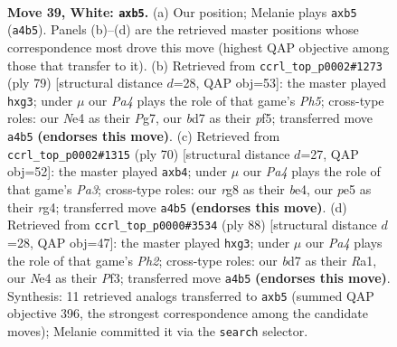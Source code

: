 \documentclass[11pt]{article}
\begin{document}
\clearpage

\begin{figure}[p]\centering
\begin{subfigure}{0.46\textwidth}\centering
\resizebox{\linewidth}{!}{%
\newchessgame
\chessboard[
  setfen={6r1/3bk3/8/pp2p3/P3N3/1P3KP1/8/6R1 w - - 0 39},
  showmover=false,
  pgfstyle=straightmove, color=movearrow, markmove={a4-b5}
]}
\caption{}
\end{subfigure}\hfill
\begin{subfigure}{0.46\textwidth}\centering
\resizebox{\linewidth}{!}{%
\newchessgame
\chessboard[
  setfen={3R4/5ppk/8/3pPP2/7p/6PP/3r4/6K1 b - - 2 40},
  showmover=false,
  pgfstyle=straightmove, color=movearrow, markmove={h4-g3}
]}
\caption{}
\end{subfigure}
\\[4pt]
\begin{subfigure}{0.46\textwidth}\centering
\resizebox{\linewidth}{!}{%
\newchessgame
\chessboard[
  setfen={3R4/1k6/4N3/p7/1p2b1r1/P7/1PP5/1K6 w - - 3 36},
  showmover=false,
  pgfstyle=straightmove, color=movearrow, markmove={a3-b4}
]}
\caption{}
\end{subfigure}\hfill
\begin{subfigure}{0.46\textwidth}\centering
\resizebox{\linewidth}{!}{%
\newchessgame
\chessboard[
  setfen={8/6p1/8/r3pp1k/P7/5Pp1/6KP/R7 w - - 0 45},
  showmover=false,
  pgfstyle=straightmove, color=movearrow, markmove={h2-g3}
]}
\caption{}
\end{subfigure}
\caption{\textbf{Move 39, White: \texttt{axb5}.} (a) Our position; Melanie plays \texttt{axb5} (\texttt{a4b5}). Panels (b)--(d) are the retrieved master positions whose correspondence most drove this move (highest QAP objective among those that transfer to it). (b) Retrieved from \texttt{ccrl\_top\_p0002\#1273} (ply 79) [structural distance $d$=28, QAP obj=53]: the master played \texttt{hxg3}; under $\mu$ our \emph{Pa4} plays the role of that game's \emph{Ph5}; cross-type roles: our \emph{N}e4 as their \emph{P}g7, our \emph{b}d7 as their \emph{p}f5; transferred move \texttt{a4b5} \textbf{(endorses this move)}. (c) Retrieved from \texttt{ccrl\_top\_p0002\#1315} (ply 70) [structural distance $d$=27, QAP obj=52]: the master played \texttt{axb4}; under $\mu$ our \emph{Pa4} plays the role of that game's \emph{Pa3}; cross-type roles: our \emph{r}g8 as their \emph{b}e4, our \emph{p}e5 as their \emph{r}g4; transferred move \texttt{a4b5} \textbf{(endorses this move)}. (d) Retrieved from \texttt{ccrl\_top\_p0000\#3534} (ply 88) [structural distance $d$=28, QAP obj=47]: the master played \texttt{hxg3}; under $\mu$ our \emph{Pa4} plays the role of that game's \emph{Ph2}; cross-type roles: our \emph{b}d7 as their \emph{R}a1, our \emph{N}e4 as their \emph{P}f3; transferred move \texttt{a4b5} \textbf{(endorses this move)}. Synthesis: 11 retrieved analogs transferred to \texttt{axb5} (summed QAP objective 396, the strongest correspondence among the candidate moves); Melanie committed it via the \texttt{search} selector.}
\label{fig:thought-m76}
\end{figure}
\end{document}
